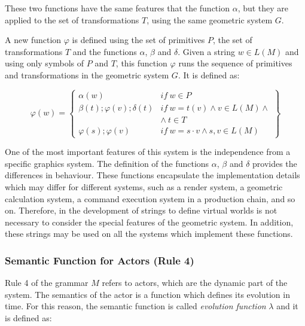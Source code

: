 \documentclass[10pt,journal,letterpaper,compsoc]{IEEEtran}
\begin{document}
These two functions have the same features that the function $\alpha$, but they
are applied to the set of transformations $T$, using the same geometric system
$G$.

A new function $\varphi$ is defined using the set of primitives $P$, the set
of transformations $T$ and the functions $\alpha$, $\beta$ and $\delta$. Given a
string $w \in L(M)$ and using only symbols of $P$ and $T$, this function
$\varphi$ runs the sequence of primitives and transformations in the geometric
system $G$. It is defined as:

\begin{equation}
    \varphi (w) = \left\{
    \begin{array}{ll}
        \alpha(w) & \mathit{if} \ w \in P  \\

        \beta(t); \varphi(v); \delta(t) & \mathit{if} \ w = t(v) \wedge v \in L(M) \wedge\\
                                        & \wedge \ t \in T \\

        \varphi(s); \varphi(v)  & \mathit{if} \ w = s \cdotp v \wedge s, v \in L(M)
    \end{array}\right\}
\end{equation}


One of the most important features of this system is the independence from a specific graphics
system. The definition of the functions $\alpha$, $\beta$ and $\delta$ provides the differences in
behaviour. These functions encapsulate the implementation details which may differ for different
systems, such as a render system, a geometric calculation system, a command execution system in a
production chain, and so on. Therefore, in the development of strings to define virtual worlds is
not necessary to consider the special features of the geometric system. In addition, these strings
may be used on all the systems which implement these functions.



\subsubsection{Semantic Function for Actors (Rule 4)
\label{sec:rule4}}

Rule 4 of the grammar $M$ refers to actors, which are the dynamic part of the system. The semantics
of the actor is a function which defines its evolution in time. For this reason, the semantic
function is called \textit{evolution function} $\lambda$ and it is defined as:
\end{document}
